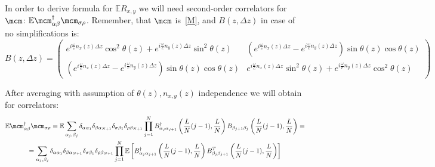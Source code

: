 \documentclass[12pt, notitlepage]{report}
\begin{document}
In order to derive formula for $\mathbb{E}R_{x,y}$ we will need second-order correlators for $\mcm$: $\mathbb{E}\mcm^\dagger_{\alpha\beta}\mcm_{\sigma\rho}$. Remember, that $\mcm$ is~\eqref{M}, and $B(z,\Delta z)$ in case of no simplifications is:
\begin{equation*}
B(z, \Delta z) =  \begin{pmatrix}
	e^{i\frac{\omega}{c}n_x(z)\Delta z} \cos^2\theta(z) + e^{i\frac{\omega}{c}n_y(z) \Delta z} \sin^2\theta(z) & (e^{i\frac{\omega}{c}n_x(z)\Delta z} - e^{i\frac{\omega}{c}n_y(z) \Delta z}) \sin\theta(z)\cos\theta(z) \\
	(e^{i\frac{\omega}{c}n_x(z)\Delta z} - e^{i\frac{\omega}{c}n_y(z) \Delta z}) \sin\theta(z)\cos\theta(z) & e^{i\frac{\omega}{c}n_x(z)\Delta z} \sin^2\theta(z) + e^{i\frac{\omega}{c}n_y(z) \Delta z} \cos^2\theta(z) 
\end{pmatrix}
\end{equation*}

After averaging with assumption of $\theta(z), n_{x,y}(z)$ independence we will obtain for correlators:
\begin{multline*}
\mathbb{E}\mcm^\dagger_{\alpha\beta}\mcm_{\sigma\rho} = \mathbb{E}
\sum\limits_{\alpha_j,\beta_j}\delta_{\alpha\alpha_1}\delta_{\beta\alpha_{N+1}}\delta_{\sigma\beta_1}\delta_{\rho\beta_{N+1}}\prod\limits_{j=1}^{N} B^\dagger_{\alpha_j\alpha_{j+1}}\left( \dfrac{L}{N}(j-1), \dfrac{L}{N} \right)B_{\beta_{j+1}\beta_j}\left( \dfrac{L}{N}(j-1), \dfrac{L}{N} \right) = \\ =
\sum\limits_{\alpha_j,\beta_j}\delta_{\alpha\alpha_1}\delta_{\beta\alpha_{N+1}}\delta_{\sigma\beta_1}\delta_{\rho\beta_{N+1}}\prod\limits_{j=1}^{N}\mathbb{E} \left[B^\dagger_{\alpha_j\alpha_{j+1}}\left( \dfrac{L}{N}(j-1), \dfrac{L}{N} \right)B^T_{\beta_j\beta_{j+1}}\left( \dfrac{L}{N}(j-1), \dfrac{L}{N} \right)\right]
\end{multline*}
\end{document}
